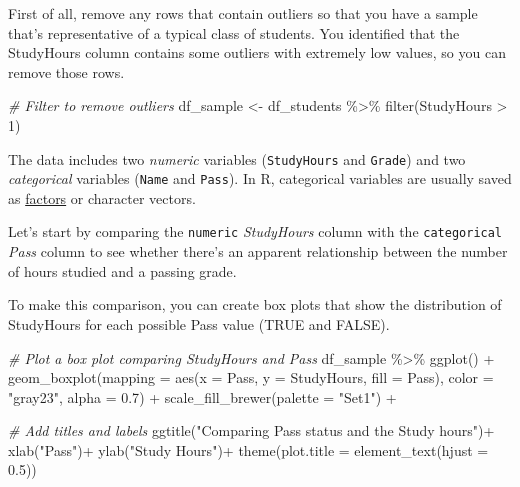 \documentclass[
]{article}
\newenvironment{Shaded}{\begin{snugshade}}{\end{snugshade}}
\newcommand{\AttributeTok}[1]{\textcolor[rgb]{0.77,0.63,0.00}{#1}}
\newcommand{\CommentTok}[1]{\textcolor[rgb]{0.56,0.35,0.01}{\textit{#1}}}
\newcommand{\DecValTok}[1]{\textcolor[rgb]{0.00,0.00,0.81}{#1}}
\newcommand{\FloatTok}[1]{\textcolor[rgb]{0.00,0.00,0.81}{#1}}
\newcommand{\FunctionTok}[1]{\textcolor[rgb]{0.00,0.00,0.00}{#1}}
\newcommand{\NormalTok}[1]{#1}
\newcommand{\OtherTok}[1]{\textcolor[rgb]{0.56,0.35,0.01}{#1}}
\newcommand{\SpecialCharTok}[1]{\textcolor[rgb]{0.00,0.00,0.00}{#1}}
\newcommand{\StringTok}[1]{\textcolor[rgb]{0.31,0.60,0.02}{#1}}
\begin{document}
First of all, remove any rows that contain outliers so that you have a
sample that's representative of a typical class of students. You
identified that the StudyHours column contains some outliers with
extremely low values, so you can remove those rows.

\begin{Shaded}
\begin{Highlighting}[]
\CommentTok{\# Filter to remove outliers}
\NormalTok{df\_sample }\OtherTok{\textless{}{-}}\NormalTok{ df\_students }\SpecialCharTok{\%\textgreater{}\%} 
  \FunctionTok{filter}\NormalTok{(StudyHours }\SpecialCharTok{\textgreater{}} \DecValTok{1}\NormalTok{)}
\end{Highlighting}
\end{Shaded}

The data includes two \emph{numeric} variables (\texttt{StudyHours} and
\texttt{Grade}) and two \emph{categorical} variables (\texttt{Name} and
\texttt{Pass}). In R, categorical variables are usually saved as
\href{https://r4ds.had.co.nz/factors.html}{factors} or character
vectors.

Let's start by comparing the \texttt{numeric} \emph{StudyHours} column
with the \texttt{categorical} \emph{Pass} column to see whether there's
an apparent relationship between the number of hours studied and a
passing grade.

To make this comparison, you can create box plots that show the
distribution of StudyHours for each possible Pass value (TRUE and
FALSE).

\begin{Shaded}
\begin{Highlighting}[]
\CommentTok{\# Plot a box plot comparing StudyHours and Pass}
\NormalTok{df\_sample }\SpecialCharTok{\%\textgreater{}\%} 
  \FunctionTok{ggplot}\NormalTok{() }\SpecialCharTok{+}
  \FunctionTok{geom\_boxplot}\NormalTok{(}\AttributeTok{mapping =} \FunctionTok{aes}\NormalTok{(}\AttributeTok{x =}\NormalTok{ Pass, }\AttributeTok{y =}\NormalTok{ StudyHours, }\AttributeTok{fill =}\NormalTok{ Pass), }\AttributeTok{color =} \StringTok{"gray23"}\NormalTok{, }\AttributeTok{alpha =} \FloatTok{0.7}\NormalTok{) }\SpecialCharTok{+}
  \FunctionTok{scale\_fill\_brewer}\NormalTok{(}\AttributeTok{palette =} \StringTok{"Set1"}\NormalTok{) }\SpecialCharTok{+}
  
\CommentTok{\# Add titles and labels}
  \FunctionTok{ggtitle}\NormalTok{(}\StringTok{"Comparing Pass status and the Study hours"}\NormalTok{)}\SpecialCharTok{+}
  \FunctionTok{xlab}\NormalTok{(}\StringTok{"Pass"}\NormalTok{)}\SpecialCharTok{+}
  \FunctionTok{ylab}\NormalTok{(}\StringTok{"Study Hours"}\NormalTok{)}\SpecialCharTok{+}
  \FunctionTok{theme}\NormalTok{(}\AttributeTok{plot.title =} \FunctionTok{element\_text}\NormalTok{(}\AttributeTok{hjust =} \FloatTok{0.5}\NormalTok{))}
\end{Highlighting}
\end{Shaded}
\end{document}
